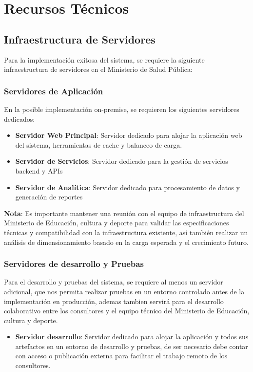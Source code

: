 
\section{Recursos Técnicos}

\subsection{Infraestructura de Servidores}

Para la implementación exitosa del sistema, se requiere la siguiente infraestructura de servidores en el Ministerio de Salud Pública:

\subsubsection{Servidores de Aplicación}

En la posible implementación on-premise, se requieren los siguientes servidores dedicados:
\begin{itemize}
    \item \textbf{Servidor Web Principal}: Servidor dedicado para alojar la aplicación web del sistema, herramientas de cache y balanceo de carga.
    \item \textbf{Servidor de Servicios}: Servidor dedicado para la gestión de servicios backend y APIs
    \item \textbf{Servidor de Analítica}: Servidor dedicado para procesamiento de datos y generación de reportes
\end{itemize}
\textbf{Nota}: Es importante mantener una reunión con el equipo de infraestructura del Ministerio de Educación, cultura y deporte para validar las especificaciones técnicas y compatibilidad con la infraestructura existente, así también realizar un análisis de dimensionamiento basado en la carga esperada y el crecimiento futuro.

\subsubsection{Servidores de desarrollo y Pruebas}
Para el desarrollo y pruebas del sistema, se requiere al menos un servidor adicional, que nos permita realizar pruebas en un entorno controlado antes de la implementación en producción, ademas tambien servirá para el desarrollo colaborativo entre los consultores y el equipo técnico del Ministerio de Educación, cultura y deporte.

\begin{itemize}
    \item \textbf{Servidor desarrollo}: Servidor dedicado para alojar la aplicación y todos sus artefactos en un entorno de desarrollo y pruebas, de ser necesario debe contar con acceso o publicación externa para facilitar el trabajo remoto de los consultores.
\end{itemize}

